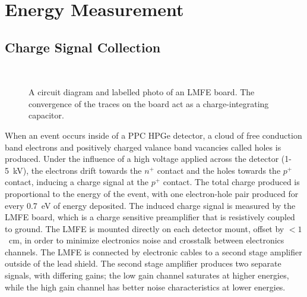 \documentclass[/main.tex]{subfiles}
\begin{document}
\section{Energy Measurement}

\subsection{Charge Signal Collection}
\begin{figure}
  \centering
  ~
  \caption[LMFE circuit diagram and photo]{\label{fig:lmfe}
    A circuit diagram and labelled photo of an LMFE board. The convergence of the traces on the board act as a charge-integrating capacitor.
  }
\end{figure}
When an event occurs inside of a PPC HPGe detector, a cloud of free conduction band electrons and positively charged valance band vacancies called holes is produced.
Under the influence of a high voltage applied across the detector (1-5~kV), the electrons drift towards the $n^+$ contact and the holes towards the $p^+$ contact, inducing a charge signal at the $p^+$ contact.
The total charge produced is proportional to the energy of the event, with one electron-hole pair produced for every 0.7~eV of energy deposited.
The induced charge signal is measured by the LMFE board, which is a charge sensitive preamplifier that is resistively coupled to ground\cite{barton2012}.
The LMFE is mounted directly on each detector mount, offset by $<1$~cm, in order to minimize electronics noise and crosstalk between electronics channels.
The LMFE is connected by electronic cables to a second stage amplifier outside of the lead shield.
The second stage amplifier produces two separate signals, with differing gains; the low gain channel saturates at higher energies, while the high gain channel has better noise characteristics at lower energies.
\end{document}
